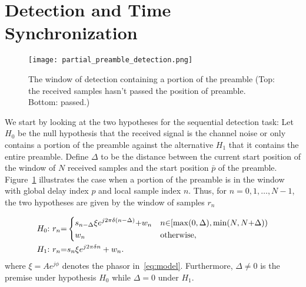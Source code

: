 \section{Detection and Time Synchronization}
\label{sec:detection}

\begin{figure}[t]
  \centerline{\texttt{[image: partial\_preamble\_detection.png]}}
  \caption{The window of detection containing a portion of the preamble (Top: the received samples hasn't passed the position of preamble. Bottom: passed.)}
  \label{fig:partial_preamble_detection}
  \end{figure}

We start by looking at the two hypotheses for the sequential detection task:
Let $H_0$ be the null hypothesis that the received signal is the channel noise or only contains a portion of the preamble against the alternative $H_1$ that it contains the entire preamble. 
Define $\Delta$ to be the distance between the current start position of the window
of $N$ received samples and the start position $\bar{p}$ of the preamble.
Figure~\ref{fig:partial_preamble_detection} illustrates the case when a portion of the 
preamble is in the window with global delay index $p$ and local sample index $n$.
Thus, for $n=0,1,\ldots,N-1$, the two hypotheses are given by the window of samples $r_n$

\begin{equation}
  \label{eq:two hypotheses}
  \begin{aligned}
  &H_0{:}~r_n{=}
  \begin{dcases}
      s_{n-\Delta}\xi e^{j2\pi\delta (n-\Delta)}{+}w_n & n{\in}[\max(0,\Delta), \min(N,N{+}\Delta)) \\
      w_n & \text{otherwise},
  \end{dcases} \\
  &H_1{:}~r_n{=}s_n\xi e^{j2\pi\delta n}+w_n.
  \end{aligned}
\end{equation}
where $\xi=Ae^{j\phi}$ denotes the phasor in~\eqref{eq:model}.
Furthermore, $\Delta \neq 0$ is the premise under hypothesis $H_0$
while $\Delta=0$ under $H_1$.  


